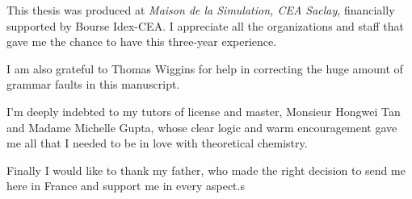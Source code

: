 This thesis was produced at\textit{ Maison de la Simulation, CEA Saclay},
financially supported by Bourse Idex-CEA. I appreciate all the organizations
and staff that gave me the chance to have this three-year experience.

I am also grateful to Thomas Wiggins for help in correcting the huge
amount of grammar faults in this manuscript.

I'm deeply indebted to my tutors of license and master, Monsieur Hongwei
Tan and Madame Michelle Gupta, whose clear logic and warm encouragement
gave me all that I needed to be in love with theoretical chemistry.

Finally I would like to thank my father, who made the right decision
to send me here in France and support me in every aspect.s

\endgroup
